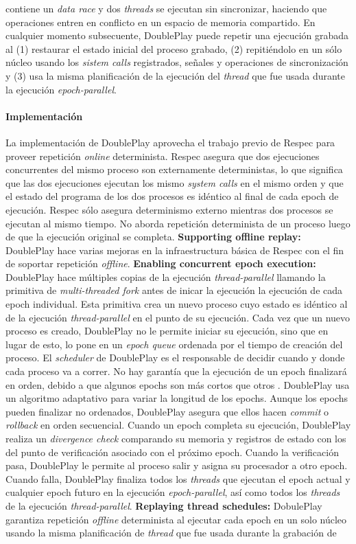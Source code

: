 contiene un \emph{data race} y dos \emph{threads} se ejecutan sin sincronizar, haciendo que operaciones entren en conflicto en un espacio de memoria compartido. En cualquier momento subsecuente, DoublePlay puede repetir una ejecución grabada al (1) restaurar el estado inicial del proceso grabado, (2) repitiéndolo en un sólo núcleo usando los \emph{sistem calls} registrados, señales y operaciones de sincronización y (3) usa la misma planificación de la ejecución del \emph{thread} que fue usada durante la ejecución \emph{epoch-parallel}.

\paragraph{\textnormal{\textbf{Implementación}}}
La implementación de DoublePlay aprovecha el trabajo previo de Respec para proveer repetición \emph{online} determinista. Respec asegura que dos ejecuciones concurrentes del mismo proceso son externamente deterministas, lo que significa que las dos ejecuciones ejecutan los mismo \emph{system calls} en el mismo orden y que el estado del programa de los dos procesos es idéntico al final de cada epoch de ejecución. Respec sólo asegura determinismo externo mientras dos procesos se ejecutan al mismo tiempo. No aborda repetición determinista de un proceso luego de que la ejecución original se completa. \textbf{Supporting offline replay:} DoublePlay hace varias mejoras en la infraestructura básica de Respec con el fin de soportar repetición \emph{offline}. \textbf{Enabling concurrent epoch execution:} DoublePlay hace múltiples copias de la ejecución \emph{thread-parallel} llamando la primitiva de \emph{multi-threaded fork} antes de inicar la ejecución la ejecución de cada epoch individual. Esta primitiva crea un nuevo proceso cuyo estado es idéntico al de la ejecución \emph{thread-parallel} en el punto de su ejecución. Cada vez que un nuevo proceso es creado, DoublePlay no le permite iniciar su ejecución, sino que en lugar de esto, lo pone en un \emph{epoch queue} ordenada por el tiempo de creación del proceso. El \emph{scheduler} de DoublePlay es el responsable de decidir cuando y donde cada proceso va a correr. No hay garantía que la ejecución de un epoch finalizará en orden, debido a que algunos epochs son más cortos que otros . DoublePlay usa un algoritmo adaptativo para variar la longitud de los epochs. Aunque los epochs pueden finalizar no ordenados, DoublePlay asegura que ellos hacen \emph{commit} o \emph{rollback} en orden secuencial. Cuando un epoch completa su ejecución, DoublePlay realiza un \emph{divergence check} comparando su memoria y registros de estado con los del punto de verificación asociado con el próximo epoch. Cuando la verificación pasa, DoublePlay le permite al proceso salir y asigna su procesador a otro epoch. Cuando falla, DoublePlay finaliza todos los \emph{threads} que ejecutan el epoch actual y cualquier epoch futuro en la ejecución \emph{epoch-parallel}, así como todos los \emph{threads} de la ejecución \emph{thread-parallel}. \textbf{Replaying thread schedules:} DobulePlay garantiza repetición \emph{offline} determinista al ejecutar cada epoch en un solo núcleo usando la misma planificación de \emph{thread} que fue usada durante la grabación de 
